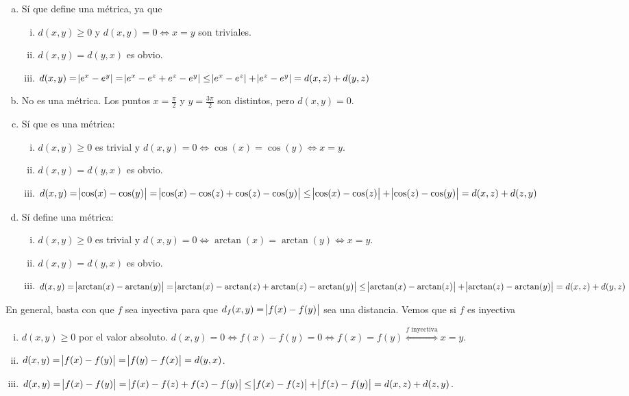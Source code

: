 \begin{ej}
	\begin{enumerate}[(a)]
		\item Sí que define una m\'etrica, ya que
			\begin{enumerate}[i)]
				\item $d(x,y) \geq 0$ y $d(x,y) = 0 \iff x = y$ son triviales.
				\item $d(x,y) = d(y,x)$ es obvio.
				\item $d(x,y) = \abs{e^x - e^y} = \abs{e^x - e^z + e^z - e^y} \leq \abs{e^x - e^z} + \abs{e^z - e^y} = d(x,z) + d(y,z)$
			\end{enumerate}
		\item No es una m\'etrica. Los puntos $x = \frac{\pi}{2}$ y $y = \frac{3\pi}{2}$ son distintos, pero $d(x, y) = 0$.
		\item Sí que es una m\'etrica:
			\begin{enumerate}[i)]
				\item $d(x, y) \geq 0$ es trivial y $d(x,y) = 0 \iff \cos(x) = \cos(y) \iff x = y$.
				\item $d(x, y) = d(y,x)$ es obvio.
				\item $d(x, y) = \abs{\cos(x) - \cos(y)} = \abs{\cos(x) - \cos(z) + \cos(z) - \cos(y)} \leq \abs{\cos(x) - \cos(z)}
					+ \abs{\cos(z) - \cos(y)} = d(x,z) + d(z,y)$
			\end{enumerate}
		\item Sí define una m\'etrica:
			\begin{enumerate}[i)]
				\item $d(x, y) \geq 0$ es trivial y $d(x, y) = 0 \iff \arctan(x) = \arctan(y) \iff x = y$.
				\item $d(x, y) = d(y, x)$ es obvio.
				\item $d(x, y) = \abs{\arctan(x) - \arctan(y)} = \abs{\arctan(x) - \arctan(z) + \arctan(z) - \arctan(y)} \leq
					\abs{\arctan(x) - \arctan(z)} + \abs{\arctan(z) - \arctan(y)} = d(x, z) + d(y,z)$
			\end{enumerate}
	\end{enumerate}

	En general, basta con que $f$ sea inyectiva para que $d_f(x,y) = \abs{f(x) - f(y)}$ sea una distancia. Vemos que si $f$ es inyectiva
	\begin{enumerate}[i)]
		\item $d(x,y) \geq 0$ por el valor absoluto. $d(x, y) = 0 \iff f(x) - f(y) = 0 \iff f(x) = f(y) \stackrel{f \text{ inyectiva}}{\iff} x = y$.
		\item $d(x,y) = \abs{f(x) - f(y)} = \abs{f(y) - f(x)} = d(y,x)$.
		\item $d(x,y) = \abs{f(x) - f(y)} = \abs{f(x) - f(z) + f(z) - f(y)} \leq \abs{f(x) - f(z)} + \abs{f(z) - f(y)} = d(x, z) + d(z, y)$.
	\end{enumerate}
\end{ej}


